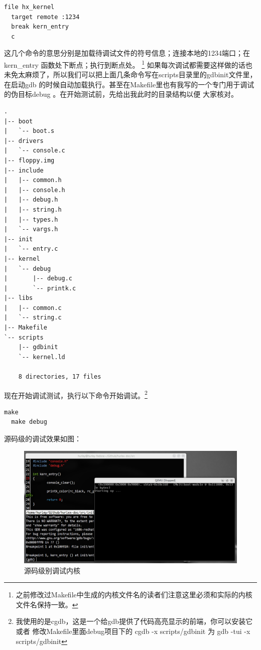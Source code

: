 \begin{Verbatim}[frame=single]
  file hx_kernel
  target remote :1234
  break kern_entry
  c
\end{Verbatim}

\par 这几个命令的意思分别是加载待调试文件的符号信息；连接本地的1234端口；在 kern\_entry 函数处下断点；执行到断点处。\allowbreak
\footnote{之前修改过Makefile中生成的内核文件名的读者们注意这里必须和实际的内核文件名保持一致。}\allowbreak
如果每次调试都需要这样做的话也未免太麻烦了，所以我们可以把上面几条命令写在scripts目录里的gdbinit文件里，在启动gdb\allowbreak
的时候自动加载执行。甚至在Makefile里也有我写的一个专门用于调试的伪目标debug 。在开始测试前，先给出我此时的目录结构以便\allowbreak
大家核对。

\begin{Verbatim}[frame=single]
.
|-- boot
|   `-- boot.s
|-- drivers
|   `-- console.c
|-- floppy.img
|-- include
|   |-- common.h
|   |-- console.h
|   |-- debug.h
|   |-- string.h
|   |-- types.h
|   `-- vargs.h
|-- init
|   `-- entry.c
|-- kernel
|   `-- debug
|       |-- debug.c
|       `-- printk.c
|-- libs
|   |-- common.c
|   `-- string.c
|-- Makefile
`-- scripts
    |-- gdbinit
    `-- kernel.ld
    
    8 directories, 17 files
\end{Verbatim}

\par 现在开始调试测试，执行以下命令开始调试。\footnote{我使用的是cgdb，这是一个给gdb提供了代码高亮显示的前端，你可以安装它或者\allowbreak
修改Makefile里面debug项目下的 cgdb -x scripts/gdbinit 为 gdb -tui -x scripts/gdbinit}

\begin{Verbatim}[frame=single]
  make
  make debug
\end{Verbatim}

\par 源码级的调试效果如图：

\begin{figure}[ht]
      \centering
      \includegraphics[scale=0.4]{picture/chapt5/os_debug.png}
      \caption{源码级别调试内核}
\end{figure}

